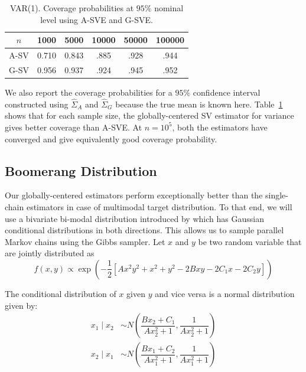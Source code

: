 \documentclass[11pt]{article}
\theoremstyle{remark}
\begin{document}
\begin{table}[h]
    \centering
    \begin{tabular}{|c|ccccc|}
    \hline
$n$  &  1000  & 5000  & 10000  & 50000  & 100000 \\  \hline
A-SV  &    0.710 & 0.843 & .885 & .928 & .944 \\ 
G-SV  &    0.956 & 0.937 & .924 & .945 & .952 \\ \hline
    \end{tabular}
    \caption{VAR(1). Coverage probabilities at $95 \%$ nominal level using A-SVE and G-SVE.}
    \label{tab:var-coverage}
\end{table}


We also report the coverage probabilities for a $95\%$ confidence interval constructed using $\hat{\Sigma}_A$ and $\hat{\Sigma}_G$ because the true mean is known here. Table~\ref{tab:var-coverage} shows that for each sample size, the globally-centered SV estimator for variance gives better coverage than A-SVE. At $n=10^5$, both the estimators have converged and give equivalently good coverage probability.


\subsection{Boomerang Distribution} \label{ex:boomerang}


Our globally-centered estimators perform exceptionally better than the single-chain estimators in case of multimodal target distribution. To that end, we will use a bivariate bi-modal distribution introduced by \cite{gelman1991note} which has Gaussian conditional distributions in both directions. This allows us to sample parallel Markov chains using the Gibbs sampler. Let $x$ and $y$ be two random variable that are jointly distributed as 
%
\[
f(x, y) \propto \exp\left(-\dfrac{1}{2} \left[Ax^2y^2 + x^2 + y^2 -2Bxy  -2C_1x - 2C_2y  \right]\right)
\]

The conditional distribution of $x$ given $y$ and vice versa is a normal distribution given by:
%
\begin{align*}
    x_1 \mid x_2 &\sim N\left(\dfrac{Bx_2 + C_1}{Ax_2^2 + 1}, \dfrac{1}{Ax_2^2 + 1}\right)\\
    x_2 \mid x_1 &\sim N\left(\dfrac{Bx_1 + C_2}{Ax_1^2 + 1}, \dfrac{1}{Ax_1^2 + 1}\right)
\end{align*}
\end{document}
